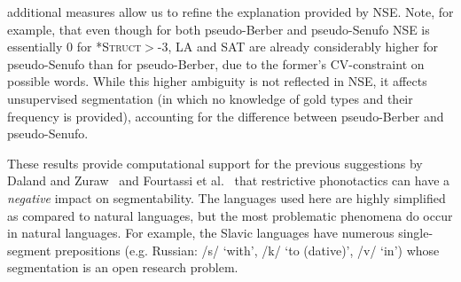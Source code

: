 \documentclass[11pt]{article}
\begin{document}
additional measures allow us to refine the explanation provided by NSE. Note, for example, that even though for both pseudo-Berber and pseudo-Senufo NSE is essentially 0 for \textsc{*Struct}$>$-3, LA and SAT are already considerably higher for pseudo-Senufo than for pseudo-Berber, due to the former's CV-constraint on possible words. While this higher ambiguity is not reflected in NSE, it affects unsupervised segmentation (in which no knowledge of gold types and their frequency is provided), accounting for the difference between pseudo-Berber and pseudo-Senufo.

These results provide computational support for the previous suggestions by Daland and Zuraw~ and Fourtassi et al.~ that restrictive phonotactics can have a \emph{negative} impact on segmentability. The languages used here are highly simplified as compared to natural languages, but the most problematic phenomena do occur in natural languages. For example, the Slavic languages have numerous single-segment prepositions (e.g. Russian: /s/ `with', /k/ `to (dative)', /v/ `in') whose segmentation is an open research problem.
\end{document}
